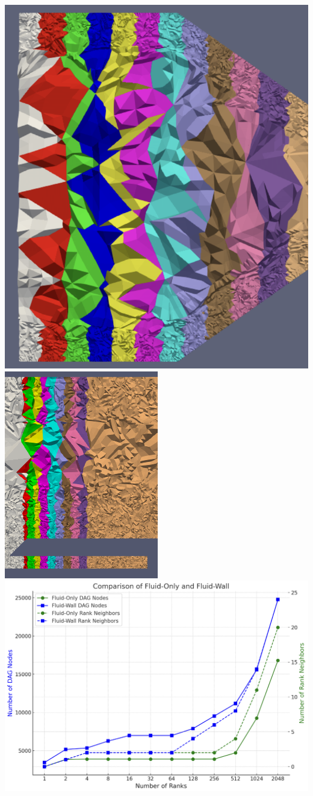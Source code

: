 \begin{frame}
\begin{columns}[T]
    \begin{column}{0.5\textwidth}
      \vspace{-15pt}
      \hspace{20pt}
      \includegraphics[width=.4\textwidth]{Figures/mtc/BadPartitioning2.png}
      \includegraphics[width=.4\textwidth]{Figures/mtc/BadPartitioning.png}
      \vfill
      \vspace{10pt}
      \hspace{20pt}
      \includegraphics[width=.7\textwidth]{Figures/mtc/dag_nodes_rank_nbrs.png}
    \end{column}
  \end{columns}
\end{frame}

